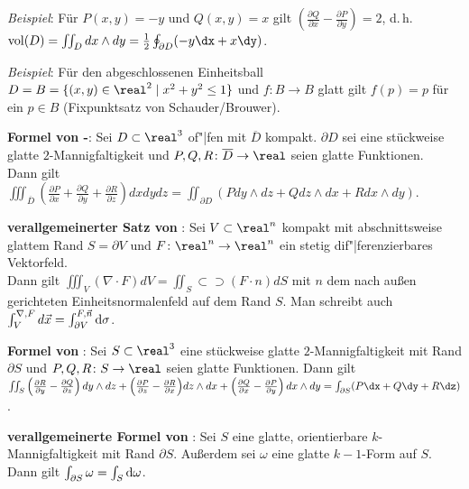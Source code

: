 \emph{Beispiel}:
Für $P(x, y) = -y$ und $Q(x, y) = x$ gilt
$\left(\frac{\partial Q}{\partial x} -
\frac{\partial P}{\partial y}\right) = 2$, d.\,h. \\
$\vol(D) =  \iint_D dx \land dy =
\frac{1}{2} \oint_{\partial D} (-y\dx + x\dy)$.

\emph{Beispiel}:
Für den abgeschlossenen Einheitsball
$D = B = \{(x, y) \in \real^2 \;|\; x^2 + y^2 \le 1\}$ und
$f\colon B \rightarrow B$ glatt gilt
$f(p) = p$ für ein $p \in B$
(Fixpunktsatz von Schauder/Brouwer).

\linie

\textbf{Formel von -}:
Sei $D \subset \real^3$ of"|fen mit $\overline{D}$ kompakt.
$\partial D$ sei eine stückweise glatte $2$-Mannigfaltigkeit und
$P, Q, R\colon \overline{D} \rightarrow \real$ seien glatte Funktionen. \\
Dann gilt $\iiint_{\overline{D}} \left(\frac{\partial P}{\partial x} +
\frac{\partial Q}{\partial y} + \frac{\partial R}{\partial z}\right) dxdydz =
\iint_{\partial D} (Pdy \land dz + Qdz \land dx + Rdx \land dy)$.

\textbf{verallgemeinerter Satz von }:
Sei $V \subset \real^n$ kompakt mit
abschnittsweise glattem Rand $S = \partial V$
und $F\colon \real^n \rightarrow \real^n$ ein stetig dif"|ferenzierbares
Vektorfeld. \\
Dann gilt $\iiint_V (\nabla \cdot F) dV =
\iint_S\!\!\!\!\!\!\!\!\!\!\!\subset\!\supset (F \cdot n) dS$
mit $n$ dem nach außen gerichteten Einheitsnormalenfeld auf dem Rand $S$.
Man schreibt auch $\int_V \sp{\nabla, F} d\vec{x} =
\int_{\partial V} \sp{F, \vec{n}} \mathrm{d}\sigma$.

\linie

\textbf{Formel von }:
Sei $S \subset \real^3$ eine stückweise glatte $2$-Mannigfaltigkeit mit Rand
$\partial S$ und $P, Q, R\colon S \rightarrow \real$ seien glatte Funktionen.
Dann gilt \\
$\iint_S \left(\frac{\partial R}{\partial y} -
\frac{\partial Q}{\partial z}\right) dy \land dz + 
\Big(\frac{\partial P}{\partial z} -
\frac{\partial R}{\partial x}\Big) dz \land dx + 
\left(\frac{\partial Q}{\partial x} -
\frac{\partial P}{\partial y}\right) dx \land dy =
\int_{\partial S} (P\dx + Q\dy + R\dz)$.

\textbf{verallgemeinerte Formel von }:
Sei $S$ eine glatte, orientierbare $k$-Mannigfaltigkeit mit Rand $\partial S$.
Außerdem sei $\omega$ eine glatte $k - 1$-Form auf $S$. \\
Dann gilt $\int_{\partial S} \omega = \int_S \mathrm{d} \omega$.

